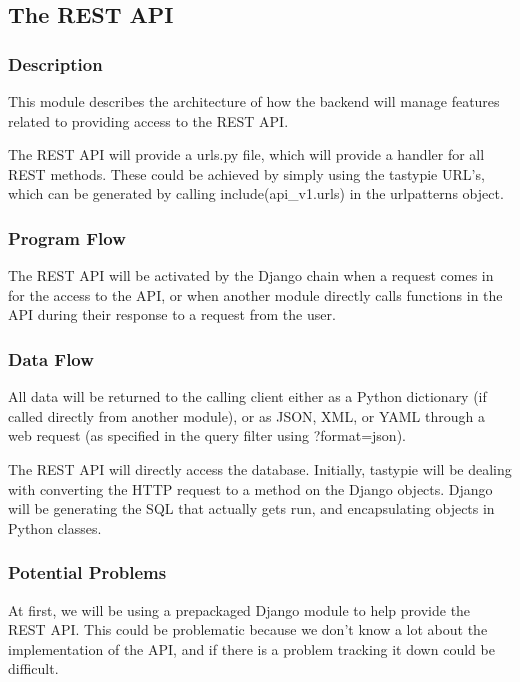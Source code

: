 
\subsection{The REST API}

\subsubsection{Description}

This module describes the architecture of how the backend will manage features related to providing access to the REST API.

The REST API will provide a urls.py file, which will provide a handler for all REST methods. These could be achieved by simply using the tastypie URL's, which can be generated by calling include(api\_v1.urls) in the urlpatterns object.

\subsubsection{Program Flow}

The REST API will be activated by the Django chain when a request comes in for the access to the API, or when another module directly calls functions in the API during their response to a request from the user.

\subsubsection{Data Flow}

All data will be returned to the calling client either as a Python dictionary (if called directly from another module), or as JSON, XML, or YAML through a web request (as specified in the query filter using ?format=json).

The REST API will directly access the database. Initially, tastypie will be dealing with converting the HTTP request to a method on the Django objects. Django will be generating the SQL that actually gets run, and encapsulating objects in Python classes. 

\subsubsection{Potential Problems}

At first, we will be using a prepackaged Django module to help provide the REST API. This could be problematic because we don't know a lot about the implementation of the API, and if there is a problem tracking it down could be difficult.

